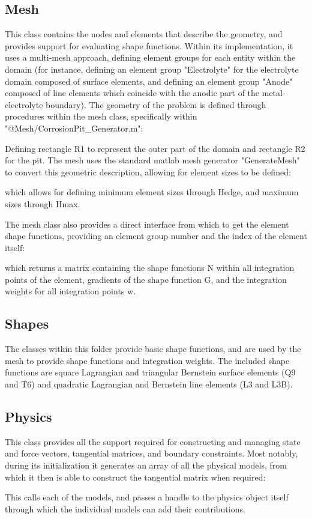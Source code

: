 \documentclass[3p]{elsarticle} %
\begin{document}
\subsection{Mesh}
This class contains the nodes and elements that describe the geometry, and provides support for evaluating shape functions. Within its implementation, it uses a multi-mesh approach, defining element groups for each entity within the domain (for instance, defining an element group "Electrolyte" for the electrolyte domain composed of surface elements, and defining an element group "Anode" composed of line elements which coincide with the anodic part of the metal-electrolyte boundary). The geometry of the problem is defined through procedures within the mesh class, specifically within "@Mesh/CorrosionPit{\_}Generator.m":

Defining rectangle R1 to represent the outer part of the domain and rectangle R2 for the pit. The mesh uses the standard matlab mesh generator "GenerateMesh" to convert this geometric description, allowing for element sizes to be defined:

which allows for defining minimum element sizes through Hedge, and maximum sizes through Hmax. 

The mesh class also provides a direct interface from which to get the element shape functions, providing an element group number and the index of the element itself:

which returns a matrix containing the shape functions N within all integration points of the element, gradients of the shape function G, and the integration weights for all integration points w. 

\subsection{Shapes}
The classes within this folder provide basic shape functions, and are used by the mesh to provide shape functions and integration weights. The included shape functions are square Lagrangian and triangular Bernstein surface elements (Q9 and T6) and quadratic Lagrangian and Bernstein line elements (L3 and L3B).

\subsection{Physics}
This class provides all the support required for constructing and managing state and force vectors, tangential matrices, and boundary constraints. Most notably, during its initialization it generates an array of all the physical models, from which it then is able to construct the tangential matrix when required:

This calls each of the models, and passes a handle to the physics object itself through which the individual models can add their contributions. 
\end{document}
